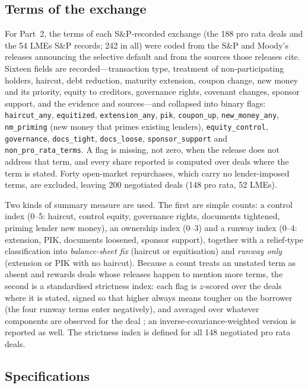 \documentclass[12pt]{article}
\begin{document}
\subsection{Terms of the exchange}

For Part~2, the terms of each S\&P-recorded exchange (the 188 pro rata deals and the 54 LMEs S\&P records; 242 in all) were coded from the S\&P and Moody's releases announcing the selective default and from the sources those releases cite. Sixteen fields are recorded---transaction type, treatment of non-participating holders, haircut, debt reduction, maturity extension, coupon change, new money and its priority, equity to creditors, governance rights, covenant changes, sponsor support, and the evidence and sources---and collapsed into binary flags: \texttt{haircut\_any}, \texttt{equitized}, \texttt{extension\_any}, \texttt{pik}, \texttt{coupon\_up}, \texttt{new\_money\_any}, \texttt{nm\_priming} (new money that primes existing lenders), \texttt{equity\_control}, \texttt{governance}, \texttt{docs\_tight}, \texttt{docs\_loose}, \texttt{sponsor\_support} and \texttt{non\_pro\_rata\_terms}. A flag is missing, not zero, when the release does not address that term, and every share reported is computed over deals where the term is stated. Forty open-market repurchases, which carry no lender-imposed terms, are excluded, leaving 200 negotiated deals (148 pro rata, 52 LMEs).

Two kinds of summary measure are used. The first are simple counts: a control index (0--5: haircut, control equity, governance rights, documents tightened, priming lender new money), an ownership index (0--3) and a runway index (0--4: extension, PIK, documents loosened, sponsor support), together with a relief-type classification into \emph{balance-sheet fix} (haircut or equitisation) and \emph{runway only} (extension or PIK with no haircut). Because a count treats an unstated term as absent and rewards deals whose releases happen to mention more terms, the second is a standardised strictness index: each flag is $z$-scored over the deals where it is stated, signed so that higher always means tougher on the borrower (the four runway terms enter negatively), and averaged over whatever components are observed for the deal \citep{kling2007}; an inverse-covariance-weighted version \citep{anderson2008} is reported as well. The strictness index is defined for all 148 negotiated pro rata deals.

\subsection{Specifications}
\end{document}
